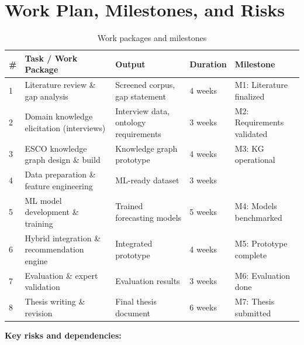 \section{Work Plan, Milestones, and Risks}
\label{sec:workplan}

\begin{table}[htbp]
  \centering
  \caption{Work packages and milestones}
  \label{tab:workplan}
  \begin{tabular}{@{}p{0.5cm}p{5.5cm}p{2.5cm}p{2cm}p{3cm}@{}}
    \toprule
    \textbf{\#} & \textbf{Task / Work Package} & \textbf{Output} &
    \textbf{Duration} & \textbf{Milestone} \\
    \midrule
    1 & Literature review \& gap analysis           & Screened corpus, gap statement & 4 weeks  & M1: Literature finalized \\
    2 & Domain knowledge elicitation (interviews)   & Interview data, ontology requirements & 3 weeks & M2: Requirements validated \\
    3 & ESCO knowledge graph design \& build        & Knowledge graph prototype & 4 weeks  & M3: KG operational \\
    4 & Data preparation \& feature engineering     & ML-ready dataset & 3 weeks  & \\
    5 & ML model development \& training            & Trained forecasting models & 5 weeks  & M4: Models benchmarked \\
    6 & Hybrid integration \& recommendation engine & Integrated prototype & 4 weeks  & M5: Prototype complete \\
    7 & Evaluation \& expert validation             & Evaluation results & 3 weeks  & M6: Evaluation done \\
    8 & Thesis writing \& revision                  & Final thesis document & 6 weeks  & M7: Thesis submitted \\
    \bottomrule
  \end{tabular}
\end{table}

\textbf{Key risks and dependencies:}

